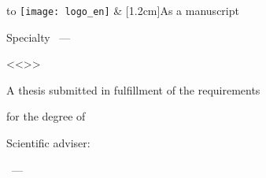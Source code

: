 \thispagestyle{empty}
\begin{center}
\thesisOrganizationEN
\end{center}


\vspace{0pt plus2fill} %

\noindent
\begin{tabu} to\linewidth {X[l,p]X[r,p]}
    \texttt{[image: logo\_en]}
    &
    [1.2cm]{As a manuscript} \\
\end{tabu}


\vspace{0pt plus6fill} %
\begin{center}%
    {\large \thesisAuthorEN}
\end{center}%
%
\vspace{0pt plus1fill} %
\begin{center}%
    \textbf {\large %
        \thesisTitleEN}
    
    \vspace{0pt plus2fill} %
    {%
        Specialty \thesisSpecialtyNumberEN~---
        
        <<\thesisSpecialtyTitleEN>>
    }
    
    \vspace{0pt plus2fill} %
    A thesis submitted in fulfillment of the requirements \par for the degree of 
    \thesisDegreeEN
\end{center}%
%
\vspace{0pt plus4fill} %
\begin{flushright}%
    Scientific adviser:
    
    \supervisorRegaliaEN
    
    \supervisorFioEN
\end{flushright}%
%
\vspace{0pt plus4fill} %
\begin{center}%
    {\thesisCityEN~--- \thesisYearEN}
\end{center}%
